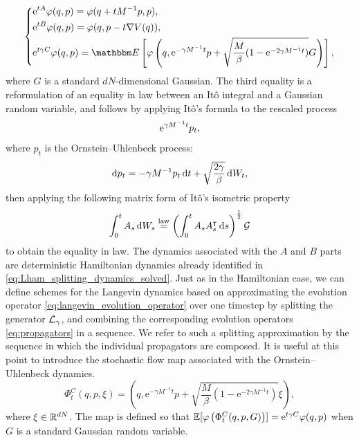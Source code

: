 \begin{equation}
  \label{eq:propagators}
  \left\{\begin{aligned}
    &\mathrm{e}^{tA}\varphi(q,p)=\varphi(q+tM^{-1}p,p),\\
    &\mathrm{e}^{tB}\varphi(q,p)=\varphi(q,p-t\nabla V(q)),\\
   &\mathrm{e}^{t\gamma C}\varphi(q,p)=\mathbbm E \left[\varphi \left(q, \mathrm e^{-\gamma M^{-1}t}p + \sqrt{\frac{M}{\beta}(1-\mathrm{e}^{-2\gamma M^{-1}t})}G\right)\right],
\end{aligned}\right.
\end{equation}
where $G$ is a standard $dN$-dimensional Gaussian. The third equality is a reformulation of an equality in law between an Itô integral and a Gaussian random variable, and follows by applying Itô's formula to the rescaled process
$$\mathrm{e}^{\gamma M^{-1}t}p_t,$$
where $p_t$ is the Ornstein--Uhlenbeck process:
\begin{equation}
    \mathrm{d} p_t=-\gamma M^{-1}p_t\,\mathrm{d} t+\sqrt{\frac{2\gamma}{\beta}}\,\mathrm{d} W_t,
\end{equation}
then applying the following matrix form of Itô's isometric property 
\begin{equation}
    \label{eq:ito_isometry_matrix}
    \int_0^t A_s\,\mathrm{d} W_s \overset{\mathrm{law}}{=} \left(\int_0^t A_s A_s^\intercal \,\mathrm{d} s\right)^{\frac12}\mathcal G
\end{equation}
to obtain the equality in law.
 The dynamics associated with the $A$ and $B$ parts are deterministic Hamiltonian dynamics already identified in \eqref{eq:Lham_splitting_dynamics_solved}.
Just as in the Hamiltonian case, we can define schemes for the Langevin dynamics based on approximating the evolution operator \eqref{eq:langevin_evolution_operator} over one timestep by splitting the generator $\mathcal{L}_\gamma$, and combining the corresponding evolution operators \eqref{eq:propagators} in a sequence.
We refer to such a splitting approximation by the sequence in which the individual propagators are composed. It is useful at this point to introduce the stochastic flow map associated with the Ornstein--Uhlenbeck dynamics.
\begin{equation}
    \label{eq:stochastic_flow_c}
    \Phi_t^C(q,p,\xi)=\left(q, \mathrm e^{-\gamma M^{-1}t}p + \sqrt{\frac{M}{\beta}(1-\mathrm{e}^{-2\gamma M^{-1}t})}\xi\right),
\end{equation}
where $\xi\in \mathbb{R}^{dN}$. The map is defined so that $\mathbb{E}[\varphi\left(\Phi_t^C(q,p,G)\right)]=\mathrm{e}^{t\gamma C}\varphi(q,p)$ when $G$ is a standard Gaussian random variable.
